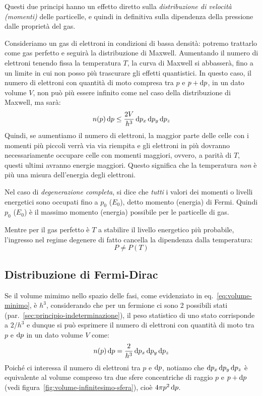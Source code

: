 Questi due principi hanno un effetto diretto sulla \emph{distribuzione di velocità (momenti)} delle particelle, e quindi in definitiva sulla dipendenza della pressione dalle proprietà del gas. 

Consideriamo un gas di elettroni in condizioni di bassa densità: potremo trattarlo come gas perfetto e seguirà la distribuzione di Maxwell. Aumentando il numero di elettroni tenendo fissa la temperatura $T$, la curva di Maxwell si abbasserà, fino a un limite in cui non posso più trascurare gli effetti quantistici. In questo caso, il numero di elettroni con quantità di moto compresa tra $p$ e $p + \mathop{\mathrm{{}d}}\mathopen{} p$, in  un dato volume $V$, non può più essere infinito come nel caso della distribuzione di Maxwell, ma sarà:
\[
n(p) \mathop{\mathrm{{}d}}\mathopen{} p \leq \frac{2V}{h^3} \mathop{\mathrm{{}d}}\mathopen{} p_x \mathop{\mathrm{{}d}}\mathopen{} p_y \mathop{\mathrm{{}d}}\mathopen{} p_z
\]
Quindi, se aumentiamo il numero di elettroni, la maggior parte delle celle con i momenti più piccoli verrà via via riempita e gli elettroni in più dovranno necessariamente occupare celle con momenti maggiori, ovvero, a parità di $T$, questi ultimi avranno energie maggiori. Questo significa che la temperatura \emph{non} è più una misura dell'energia degli elettroni. 

Nel caso di \emph{degenerazione completa}, si dice che \emph{tutti}
i valori dei momenti o livelli energetici sono occupati fino a $p_0$ ($E_0$), detto momento (energia) di Fermi. Quindi $p_0$ ($E_0$) è il massimo momento (energia) possibile per le particelle di gas. 

Mentre per il gas perfetto è $T$ a stabilire il livello energetico più probabile, l'ingresso nel regime degenere di fatto cancella la dipendenza dalla temperatura:
\[
P \neq P(T)
\]

\subsection{Distribuzione di Fermi-Dirac}
Se il volume mimimo nello spazio delle fasi, come evidenziato in eq.~\eqref{eq:volume-minimo}, è $h^3$, considerando che per un fermione ci sono 2 possibili stati (par.~\ref{sec:principio-indeterminazione}), il peso statistico di uno stato corrisponde a $2 / h^3$ e dunque si può esprimere il numero di elettroni con quantità di moto tra $p$ e $\mathop{\mathrm{{}d}}\mathopen{} p$ in un dato volume $V$ come:
\[
n(p) \mathop{\mathrm{{}d}}\mathopen{} p = \frac{2}{h^3} \mathop{\mathrm{{}d}}\mathopen{} p_x \mathop{\mathrm{{}d}}\mathopen{} p_y \mathop{\mathrm{{}d}}\mathopen{} p_z
\]
Poiché ci interessa il numero di elettroni tra $p$ e $\mathop{\mathrm{{}d}}\mathopen{} p$, notiamo che $\mathop{\mathrm{{}d}}\mathopen{} p_x \mathop{\mathrm{{}d}}\mathopen{} p_y \mathop{\mathrm{{}d}}\mathopen{} p_z$ è equivalente al volume compreso tra due sfere concentriche di raggio $p$ e $p + \mathop{\mathrm{{}d}}\mathopen{} p$ (vedi figura~\ref{fig:volume-infinitesimo-sfera}), cioè $4 \pi p^2 \mathop{\mathrm{{}d}}\mathopen{} p$. 

